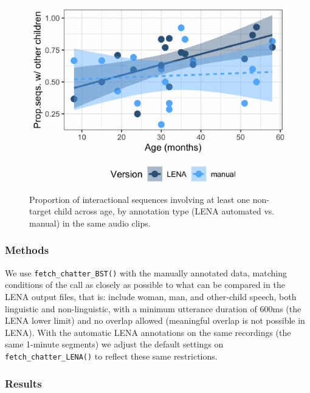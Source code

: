 \documentclass[10pt, letterpaper]{article}
\newenvironment{CodeChunk}{}{}
\begin{document}
\begin{CodeChunk}
\begin{figure}[h!]

{\centering \includegraphics{figs/tsi.is.fig-1} 

}

\caption[Proportion of interactional sequences involving at least one non-target child across age, by annotation type (LENA automated vs]{Proportion of interactional sequences involving at least one non-target child across age, by annotation type (LENA automated vs. manual) in the same audio clips.}\label{fig:tsi.is.fig}
\end{figure}
\end{CodeChunk}

\hypertarget{methods-1}{%
\subsubsection{Methods}\label{methods-1}}

We use \texttt{fetch\_chatter\_BST()} with the manually annotated data,
matching conditions of the call as closely as possible to what can be
compared in the LENA output files, that is: include woman, man, and
other-child speech, both linguistic and non-linguistic, with a minimum
utterance duration of 600ms (the LENA lower limit) and no overlap
allowed (meaningful overlap is not possible in LENA). With the automatic
LENA annotations on the same recordings (the same 1-minute segments) we
adjust the default settings on \texttt{fetch\_chatter\_LENA()} to
reflect these same restrictions.

\hypertarget{results-1}{%
\subsubsection{Results}\label{results-1}}
\end{document}
